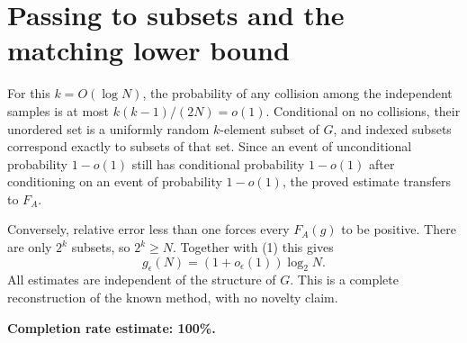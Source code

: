 \documentclass[11pt]{article}
\begin{document}
\section*{Passing to subsets and the matching lower bound}
For this $k=O(\log N)$, the probability of any collision among the independent samples is at most $k(k-1)/(2N)=o(1)$. Conditional on no collisions, their unordered set is a uniformly random $k$-element subset of $G$, and indexed subsets correspond exactly to subsets of that set. Since an event of unconditional probability $1-o(1)$ still has conditional probability $1-o(1)$ after conditioning on an event of probability $1-o(1)$, the proved estimate transfers to $F_A$.

Conversely, relative error less than one forces every $F_A(g)$ to be positive. There are only $2^k$ subsets, so $2^k\ge N$. Together with (1) this gives
\[
 g_\epsilon(N)=(1+o_\epsilon(1))\log_2N.
\]
All estimates are independent of the structure of $G$. This is a complete reconstruction of the known method, with no novelty claim.

\textbf{Completion rate estimate: 100\%.}
\end{document}
